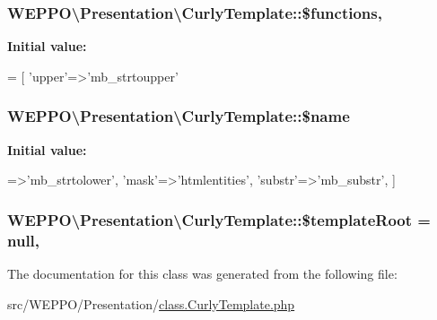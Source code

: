 \subsubsection[{\texorpdfstring{\$functions}{$functions}}]{\setlength{\rightskip}{0pt plus 5cm}W\+E\+P\+P\+O\textbackslash{}\+Presentation\textbackslash{}\+Curly\+Template\+::\$functions\hspace{0.3cm}{\ttfamily [static]}, {\ttfamily [protected]}}\hypertarget{classWEPPO_1_1Presentation_1_1CurlyTemplate_a443c112631fb71bf1a129c54932da46f}{}\label{classWEPPO_1_1Presentation_1_1CurlyTemplate_a443c112631fb71bf1a129c54932da46f}
{\bfseries Initial value\+:}
\begin{DoxyCode}
= [
        \textcolor{stringliteral}{'upper'}=>\textcolor{stringliteral}{'mb\_strtoupper'}
\end{DoxyCode}
\subsubsection[{\texorpdfstring{\$name}{$name}}]{\setlength{\rightskip}{0pt plus 5cm}W\+E\+P\+P\+O\textbackslash{}\+Presentation\textbackslash{}\+Curly\+Template\+::\$name\hspace{0.3cm}{\ttfamily [protected]}}\hypertarget{classWEPPO_1_1Presentation_1_1CurlyTemplate_a293c875cfe777123a111d451fbe7bec2}{}\label{classWEPPO_1_1Presentation_1_1CurlyTemplate_a293c875cfe777123a111d451fbe7bec2}
{\bfseries Initial value\+:}
\begin{DoxyCode}
=>\textcolor{stringliteral}{'mb\_strtolower'},
        \textcolor{stringliteral}{'mask'}=>\textcolor{stringliteral}{'htmlentities'},
        \textcolor{stringliteral}{'substr'}=>\textcolor{stringliteral}{'mb\_substr'},
    ]
\end{DoxyCode}
\subsubsection[{\texorpdfstring{\$template\+Root}{$templateRoot}}]{\setlength{\rightskip}{0pt plus 5cm}W\+E\+P\+P\+O\textbackslash{}\+Presentation\textbackslash{}\+Curly\+Template\+::\$template\+Root = null\hspace{0.3cm}{\ttfamily [static]}, {\ttfamily [protected]}}\hypertarget{classWEPPO_1_1Presentation_1_1CurlyTemplate_aebc84667fdecb071bd5efdd06f4524fc}{}\label{classWEPPO_1_1Presentation_1_1CurlyTemplate_aebc84667fdecb071bd5efdd06f4524fc}


The documentation for this class was generated from the following file\+:\begin{DoxyCompactItemize}
\item 
src/\+W\+E\+P\+P\+O/\+Presentation/\hyperlink{class_8CurlyTemplate_8php}{class.\+Curly\+Template.\+php}\end{DoxyCompactItemize}

